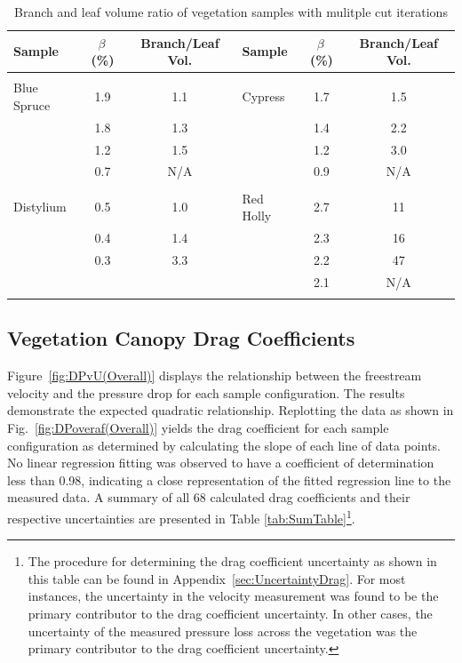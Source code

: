 \documentclass[12pt]{article}
\begin{document}
\begin{table}[!h]
\caption[Branch and leaf volume ratio of vegetation samples]{Branch and leaf volume ratio of vegetation samples with mulitple cut iterations}
\label{tab:RatioTable}
\centering

	\begin{tabular*}{\textwidth}{lcclcc}
			\hline
\rule{0pt}{14pt}\textbf{Sample}	&\textbf{$\beta$\,(\%)}	& {\bf Branch/Leaf Vol.}  \hspace{.2in}  		&\textbf{Sample}		&	\textbf{$\beta$\,(\%)}	& {\bf Branch/Leaf Vol.}	\\
\hline
\\[0.01cm]
Blue Spruce		    		&	1.9			& 	1.1			        				& Cypress       		&	1.7		&	1.5						\\
					&	1.8			& 	1.3							&				&	1.4		&	2.2						\\
					&	1.2			& 	1.5							&				&	1.2		&	3.0						\\
					&	0.7			&	N/A							&				&	0.9		&  	N/A 						\\
					&				&								&				&			&       							\\
Distylium				&	0.5			&	1.0							& Red Holly	     		&	2.7		&	11						\\
					&	0.4			&	1.4							&				&	2.3		&	16						\\
					&	0.3			&	3.3							&				&	2.2		&	47						\\
					&				&								&				&	2.1		&        N/A 						\\
\\[0.005cm]
\hline

\end{tabular*}
\end{table}

\pagebreak


\subsection{Vegetation Canopy Drag Coefficients}
\label{ssec:headingscap}

Figure~\ref{fig:DPvU(Overall)} displays the relationship between the freestream velocity and the pressure drop for each sample configuration. The results demonstrate the expected quadratic relationship. Replotting the data as shown in Fig.~\ref{fig:DPoveraf(Overall)} yields the drag coefficient for each sample configuration as determined by calculating the slope of each line of data points. No linear regression fitting was observed to have a coefficient of determination less than 0.98, indicating a close representation of the fitted regression line to the measured data. A summary of all 68 calculated drag coefficients and their respective uncertainties are presented in Table \ref{tab:SumTable}\footnote{The procedure for determining the drag coefficient uncertainty as shown in this table can be found in Appendix~\ref{sec:UncertaintyDrag}. For most instances, the uncertainty in the velocity measurement was found to be the primary contributor to the drag coefficient uncertainty. In other cases, the uncertainty of the measured pressure loss across the vegetation was the primary contributor to the drag coefficient uncertainty.}.
\end{document}
